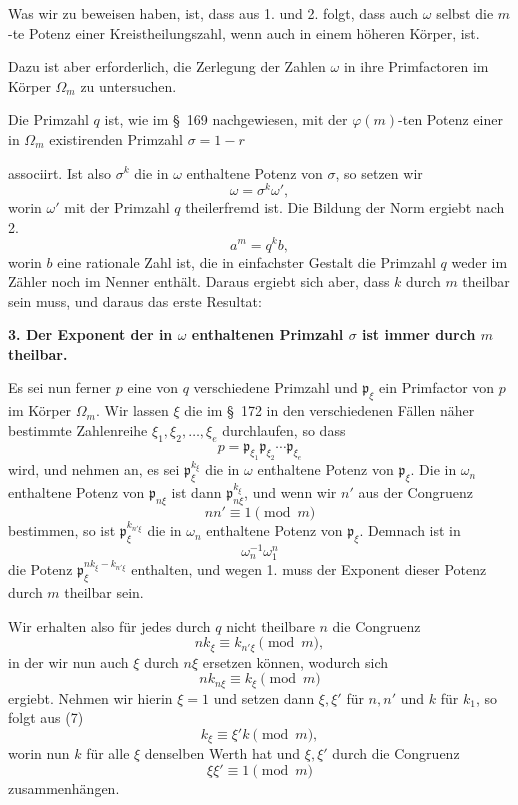 \documentclass[11pt]{article}
\newcommand{\pp}{\mathfrak p}
\begin{document}
Was wir zu beweisen haben, ist, dass aus 1. und 2. folgt, dass auch $\omega$ selbst die $m$-te Potenz einer Kreistheilungszahl, wenn auch in einem höheren Körper, ist.

Dazu ist aber erforderlich, die Zerlegung der Zahlen $\omega$ in ihre Primfactoren im Körper $\Omega_m$ zu untersuchen.

Die Primzahl $q$ ist, wie im \S~169 nachgewiesen, mit der $\varphi(m)$-ten Potenz einer in $\Omega_m$ existirenden Primzahl $\sigma=1-r$

associirt. Ist also $\sigma^k$ die in $\omega$ enthaltene Potenz von $\sigma$, so setzen wir
\[
  \omega=\sigma^k\omega',
\]
worin $\omega'$ mit der Primzahl $q$ theilerfremd ist. Die Bildung der Norm ergiebt nach 2.
\[
  a^m=q^k b,
\]
worin $b$ eine rationale Zahl ist, die in einfachster Gestalt die Primzahl $q$ weder im Zähler noch im Nenner enthält. Daraus ergiebt sich aber, dass $k$ durch $m$ theilbar sein muss, und daraus das erste Resultat:

\textbf{3. Der Exponent der in $\omega$ enthaltenen Primzahl $\sigma$ ist immer durch $m$ theilbar.}

Es sei nun ferner $p$ eine von $q$ verschiedene Primzahl und $\pp_\xi$ ein Primfactor von $p$ im Körper $\Omega_m$. Wir lassen $\xi$ die im \S~172 in den verschiedenen Fällen näher bestimmte Zahlenreihe $\xi_1,\xi_2,\ldots,\xi_e$ durchlaufen, so dass
\begin{equation}
  p=\pp_{\xi_1}\pp_{\xi_2}\cdots\pp_{\xi_e}
\tag{3}
\end{equation}
wird, und nehmen an, es sei $\pp_\xi^{k_\xi}$ die in $\omega$ enthaltene Potenz von $\pp_\xi$. Die in $\omega_n$ enthaltene Potenz von $\pp_{n\xi}$ ist dann $\pp_{n\xi}^{k_\xi}$, und wenn wir $n'$ aus der Congruenz
\begin{equation}
  nn'\equiv1\pmod m
\tag{4}
\end{equation}
bestimmen, so ist $\pp_\xi^{k_{n'\xi}}$ die in $\omega_n$ enthaltene Potenz von $\pp_\xi$. Demnach ist in
\begin{equation}
  \omega_n^{-1}\omega_1^n
\tag{5}
\end{equation}
die Potenz $\pp_\xi^{n k_\xi-k_{n'\xi}}$ enthalten, und wegen 1. muss der Exponent dieser Potenz durch $m$ theilbar sein.

Wir erhalten also für jedes durch $q$ nicht theilbare $n$ die Congruenz
\begin{equation}
  n k_\xi\equiv k_{n'\xi}\pmod m,
\tag{6}
\end{equation}
in der wir nun auch $\xi$ durch $n\xi$ ersetzen können, wodurch sich
\begin{equation}
  n k_{n\xi}\equiv k_\xi\pmod m
\tag{7}
\end{equation}
ergiebt. Nehmen wir hierin $\xi=1$ und setzen dann $\xi,\xi'$ für $n,n'$ und $k$ für $k_1$, so folgt aus (7)
\begin{equation}
  k_\xi\equiv\xi'k\pmod m,
\tag{8}
\end{equation}
worin nun $k$ für alle $\xi$ denselben Werth hat und $\xi,\xi'$ durch die Congruenz
\[
  \xi\xi'\equiv1\pmod m
\]
zusammenhängen.
\end{document}
